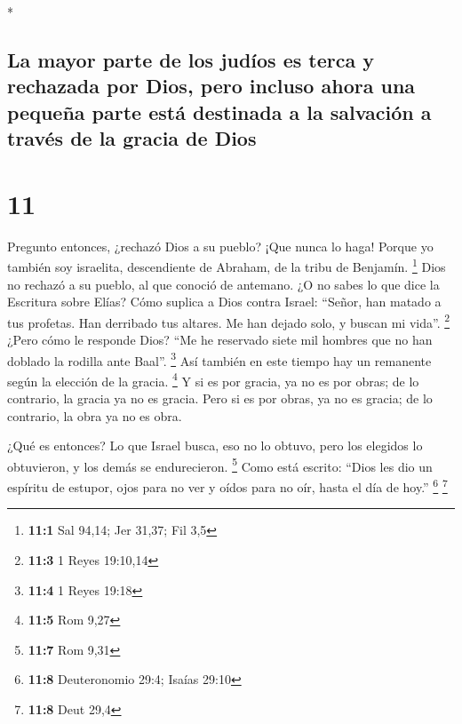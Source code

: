 \begin{paracol}{2}
\begin{otherlanguage}{english}
\end{otherlanguage}

\switchcolumn[0]*

\hypertarget{la-mayor-parte-de-los-juduxedos-es-terca-y-rechazada-por-dios-pero-incluso-ahora-una-pequeuxf1a-parte-estuxe1-destinada-a-la-salvaciuxf3n-a-travuxe9s-de-la-gracia-de-dios}{%
\subsection{La mayor parte de los judíos es terca y rechazada por Dios,
pero incluso ahora una pequeña parte está destinada a la salvación a
través de la gracia de
Dios}\label{la-mayor-parte-de-los-juduxedos-es-terca-y-rechazada-por-dios-pero-incluso-ahora-una-pequeuxf1a-parte-estuxe1-destinada-a-la-salvaciuxf3n-a-travuxe9s-de-la-gracia-de-dios}}

\hypertarget{section-20}{%
\section{11}\label{section-20}}

 Pregunto entonces, ¿rechazó Dios a su pueblo? ¡Que nunca
lo haga! Porque yo también soy israelita, descendiente de Abraham, de la
tribu de Benjamín. \footnote{\textbf{11:1} Sal 94,14; Jer 31,37; Fil 3,5}
 Dios no rechazó a su pueblo, al que conoció de antemano.
¿O no sabes lo que dice la Escritura sobre Elías? Cómo suplica a Dios
contra Israel:  ``Señor, han matado a tus profetas. Han
derribado tus altares. Me han dejado solo, y buscan mi vida''.
\footnote{\textbf{11:3} 1 Reyes 19:10,14}  ¿Pero cómo le
responde Dios? ``Me he reservado siete mil hombres que no han doblado la
rodilla ante Baal''. \footnote{\textbf{11:4} 1 Reyes 19:18}
 Así también en este tiempo hay un remanente según la
elección de la gracia. \footnote{\textbf{11:5} Rom 9,27} 
Y si es por gracia, ya no es por obras; de lo contrario, la gracia ya no
es gracia. Pero si es por obras, ya no es gracia; de lo contrario, la
obra ya no es obra.

 ¿Qué es entonces? Lo que Israel busca, eso no lo obtuvo,
pero los elegidos lo obtuvieron, y los demás se endurecieron.
\footnote{\textbf{11:7} Rom 9,31}  Como está escrito:
``Dios les dio un espíritu de estupor, ojos para no ver y oídos para no
oír, hasta el día de hoy.'' \footnote{\textbf{11:8} Deuteronomio 29:4;
  Isaías 29:10} \footnote{\textbf{11:8} Deut 29,4}


\end{paracol}
